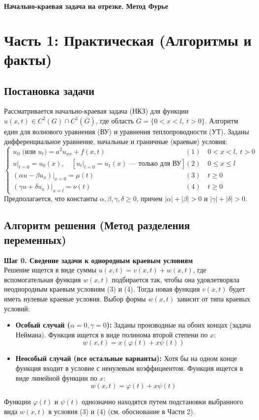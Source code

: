 \documentclass[a4paper,10pt]{article}
\begin{document}
\begin{center}
    \LARGE \textbf{Начально-краевая задача на отрезке. Метод Фурье}
\end{center}

\section{Часть 1: Практическая (Алгоритмы и факты)}

\subsection*{Постановка задачи}
Рассматривается начально-краевая задача (НКЗ) для функции $u(x, t) \in C^2(G) \cap C^1(\overline{G})$, где область $G = \{0 < x < l, \ t > 0\}$. Алгоритм един для волнового уравнения (ВУ) и уравнения теплопроводности (УТ). Заданы дифференциальное уравнение, начальные и граничные (краевые) условия:
\[
\begin{cases}
u_{tt} \ \text{(или } u_t\text{)} = a^2 u_{xx} + f(x,t) & (1) \quad 0 < x < l, \ t > 0 \\
u|_{t=0} = u_0(x), \quad \left[ u_t|_{t=0} = u_1(x) \text{ --- только для ВУ} \right] & (2) \quad 0 \le x \le l \\
(\alpha u - \beta u_x)|_{x=0} = \mu(t) & (3) \quad t \ge 0 \\
(\gamma u + \delta u_x)|_{x=l} = \nu(t) & (4) \quad t \ge 0
\end{cases}
\]
Предполагается, что константы $\alpha, \beta, \gamma, \delta \ge 0$, причем $|\alpha| + |\beta| > 0$ и $|\gamma| + |\delta| > 0$.

\subsection*{Алгоритм решения (Метод разделения переменных)}

\textbf{Шаг 0. Сведение задачи к однородным краевым условиям} \\
Решение ищется в виде суммы $u(x,t) = v(x,t) + w(x,t)$, где вспомогательная функция $w(x,t)$ подбирается так, чтобы она удовлетворяла неоднородным краевым условиям (3) и (4). Тогда новая функция $v(x,t)$ будет иметь нулевые краевые условия.
Выбор формы $w(x,t)$ зависит от типа краевых условий:
\begin{itemize}
    \item \textbf{Особый случай ($\alpha = 0, \gamma = 0$):} Заданы производные на обоих концах (задача Неймана). Функция ищется в виде полинома второй степени по $x$:
    \[ w(x,t) = x( \varphi(t) + x \psi(t) ) \]
    \item \textbf{Неособый случай (все остальные варианты):} Хотя бы на одном конце функция входит в условие с ненулевым коэффициентом. Функция ищется в виде линейной функции по $x$:
    \[ w(x,t) = \varphi(t) + x \psi(t) \]
\end{itemize}
Функции $\varphi(t)$ и $\psi(t)$ однозначно находятся путем подстановки выбранного вида $w(x,t)$ в условия (3) и (4) (см. обоснование в Части 2).
\end{document}
